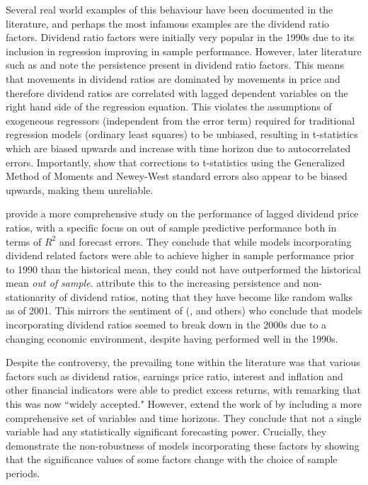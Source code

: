 \documentclass[11pt, a4paper, table]{article}
\begin{document}
Several real world examples of this behaviour have been documented in the literature, and perhaps the most infamous examples are the dividend ratio factors. Dividend ratio factors were initially very popular in the 1990s due to its inclusion in regression improving in sample performance. However, later literature such as \cite{goetzmann_testing_1993} and \cite{ang_stock_2006} note the persistence present in dividend ratio factors. This means that movements in dividend ratios are dominated by movements in price and therefore dividend ratios are correlated with lagged dependent variables on the right hand side of the regression equation. This violates the assumptions of exogeneous regressors (independent from the error term) required for traditional regression models (ordinary least squares) to be unbiased, resulting in t-statistics which are biased upwards and increase with time horizon due to autocorrelated errors. Importantly, \cite{goetzmann_testing_1993} show that corrections to t-statistics using the Generalized Method of Moments and Newey-West standard errors also appear to be biased upwards, making them unreliable. 

\cite{goyal_predicting_2003} provide a more comprehensive study on the performance of lagged dividend price ratios, with a specific focus on out of sample predictive performance both in terms of $R^2$ and forecast errors. They conclude that while models incorporating dividend related factors were able to achieve higher in sample performance prior to 1990 than the historical mean, they could not have outperformed the historical mean \textit{out of sample}. \cite{goyal_predicting_2003} attribute this to the increasing persistence and non-stationarity of dividend ratios, noting that they have become like random walks as of 2001. This mirrors the sentiment of (\cite{lettau_consumption_2001}, \cite{schwert_anomalies_2003} and others) who conclude that models incorporating dividend ratios seemed to break down in the 2000s due to a changing economic environment, despite having performed well in the 1990s.

Despite the controversy, the prevailing tone within the literature was that various factors such as dividend ratios, earnings price ratio, interest and inflation and other financial indicators were able to predict excess returns, with \cite{lettau_consumption_2001} remarking that this was now ``widely accepted." However, \cite{welch_comprehensive_2008} extend the work of \cite{goyal_predicting_2003} by including a more comprehensive set of variables and time horizons. They conclude that not a single variable had any statistically significant forecasting power. Crucially, they demonstrate the non-robustness of models incorporating these factors by showing that the significance values of some factors change with the choice of sample periods.
\end{document}
